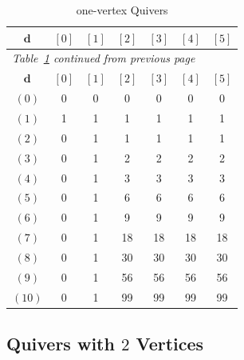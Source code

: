 \documentclass{article}
\newcommand{\bd}{\mathbf{d}}
\begin{document}
\begin{longtable}{|c|c|c|c|c|c|c|}
\caption{one-vertex Quivers}\label{tab:1vtx}\\
\hline
$\bd$ & $[0]$ & $[1]$ & $[2]$ & $[3]$ & $[4]$ & $[5]$ \\ \hline\hline
\endfirsthead
\multicolumn{7}{l}{\small\itshape Table~\ref{tab:1vtx} continued from previous page} \\ \hline
$\bd$ & $[0]$ & $[1]$ & $[2]$ & $[3]$ & $[4]$ & $[5]$ \\ \hline\hline
\endhead
\hline
\endlastfoot
$(0)$ & 0 & 0 & 0 & 0 & 0 & 0 \\ \hline
$(1)$ & 1 & 1 & 1 & 1 & 1 & 1 \\ \hline
$(2)$ & 0 & 1 & 1 & 1 & 1 & 1 \\ \hline
$(3)$ & 0 & 1 & 2 & 2 & 2 & 2 \\ \hline
$(4)$ & 0 & 1 & 3 & 3 & 3 & 3 \\ \hline
$(5)$ & 0 & 1 & 6 & 6 & 6 & 6 \\ \hline
$(6)$ & 0 & 1 & 9 & 9 & 9 & 9 \\ \hline
$(7)$ & 0 & 1 & 18 & 18 & 18 & 18 \\ \hline
$(8)$ & 0 & 1 & 30 & 30 & 30 & 30 \\ \hline
$(9)$ & 0 & 1 & 56 & 56 & 56 & 56 \\ \hline
$(10)$ & 0 & 1 & 99 & 99 & 99 & 99 \\ \hline
\end{longtable}

\subsection*{Quivers with $2$ Vertices}
\end{document}
